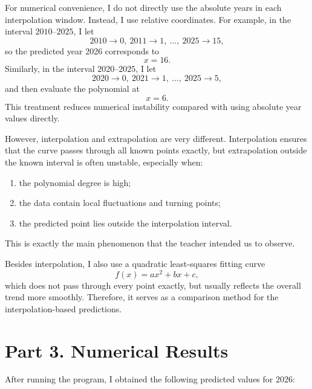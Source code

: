 \documentclass[12pt,a4paper]{article}
\begin{document}
For numerical convenience, I do not directly use the absolute years in each interpolation window. Instead, I use relative coordinates. For example, in the interval \(2010\text{--}2025\), I let
\[
2010\to 0,\ 2011\to 1,\ \ldots,\ 2025\to 15,
\]
so the predicted year 2026 corresponds to
\[
x=16.
\]
Similarly, in the interval \(2020\text{--}2025\), I let
\[
2020\to 0,\ 2021\to 1,\ \ldots,\ 2025\to 5,
\]
and then evaluate the polynomial at
\[
x=6.
\]
This treatment reduces numerical instability compared with using absolute year values directly.

However, interpolation and extrapolation are very different. Interpolation ensures that the curve passes through all known points exactly, but extrapolation outside the known interval is often unstable, especially when:
\begin{enumerate}[label=(\arabic*)]
    \item the polynomial degree is high;
    \item the data contain local fluctuations and turning points;
    \item the predicted point lies outside the interpolation interval.
\end{enumerate}

This is exactly the main phenomenon that the teacher intended us to observe.

Besides interpolation, I also use a quadratic least-squares fitting curve
\[
f(x)=ax^2+bx+c,
\]
which does not pass through every point exactly, but usually reflects the overall trend more smoothly. Therefore, it serves as a comparison method for the interpolation-based predictions.

\section{Part 3. Numerical Results}

After running the program, I obtained the following predicted values for 2026:
\end{document}
